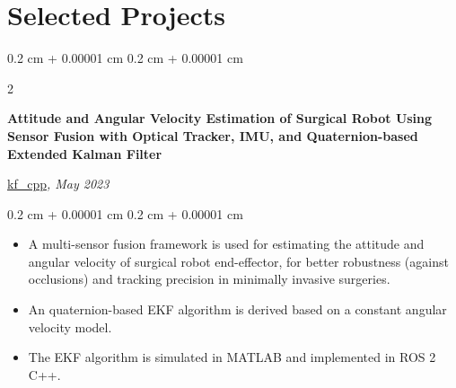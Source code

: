\documentclass[10pt, letterpaper]{article}
\newenvironment{highlights}{
    \begin{itemize}[
        topsep=0.10 cm,
        parsep=0.10 cm,
        partopsep=0pt,
        itemsep=0pt,
        leftmargin=0.4 cm + 10pt
    ]
}{
    \end{itemize}
} %
\newenvironment{onecolentry}{
    \begin{adjustwidth}{
        0.2 cm + 0.00001 cm
    }{
        0.2 cm + 0.00001 cm
    }
}{
    \end{adjustwidth}
} %
\newenvironment{twocolentry}[2][]{
    \onecolentry
    \def\secondColumn{#2}
    \setcolumnwidth{\fill, 4.5 cm}
    \begin{paracol}{2}
}{
    \switchcolumn \raggedleft \secondColumn
    \end{paracol}
    \endonecolentry
} %
\let\hrefWithoutArrow\href
\renewcommand{\href}[2]{\hrefWithoutArrow{#1}{\ifthenelse{\equal{#2}{}}{ }{#2 }\raisebox{.15ex}{\footnotesize \faExternalLink*}}}
\begin{document}






    \section{Selected Projects}

        \begin{twocolentry}{
            \hrefWithoutArrow{https://github.com/wei-hsuan-cheng/kf_cpp}{{\footnotesize\faGithub}\hspace*{0.13cm}kf\_cpp}\textit{, May 2023}
            }

            \textbf{Attitude and Angular Velocity Estimation of Surgical Robot Using Sensor Fusion with Optical Tracker, IMU, and Quaternion-based Extended Kalman Filter}
        \end{twocolentry}
        \vspace{0.10 cm}
        \begin{onecolentry}
            \begin{highlights}
                \item A multi-sensor fusion framework is used for estimating the attitude and angular velocity of surgical robot end-effector, for better robustness (against occlusions) and tracking precision in minimally invasive surgeries.
                \item An quaternion-based EKF algorithm is derived based on a constant angular velocity model.
                \item The EKF algorithm is simulated in MATLAB and implemented in ROS 2 C++.
            \end{highlights}
        \end{onecolentry}

        \vspace{0.2 cm}
\end{document}
